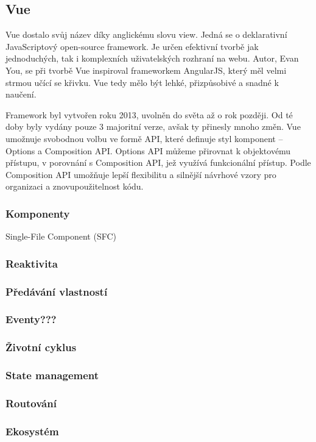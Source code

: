 \subsection{Vue}



Vue dostalo svůj název díky anglickému slovu view. Jedná se o deklarativní JavaScriptový open-source framework. 
Je určen efektivní tvorbě jak jednoduchých, tak i komplexních uživatelských rozhraní na webu. 
Autor, Evan You, se při tvorbě Vue inspiroval frameworkem AngularJS, který měl velmi strmou učící se křivku. Vue tedy mělo být lehké, přizpůsobivé a snadné k naučení.

Framework byl vytvořen roku 2013, uvolněn do světa až o rok později. Od té doby byly vydány pouze 3 majoritní verze, avšak ty přinesly mnoho změn. 
Vue umožnuje svobodnou volbu ve formě API, které definuje styl komponent -- Options a Composition API. 
Options API můžeme přirovnat k objektovému přístupu, v porovnání s Composition API, jež využívá funkcionální přístup. 
Podle \cite{vue} Composition API umožňuje lepší flexibilitu a silnější návrhové vzory pro organizaci a znovupoužitelnost kódu. 

\subsubsection{Komponenty}

Single-File Component (SFC)

\subsubsection{Reaktivita}
\subsubsection{Předávání vlastností}
\subsubsection{Eventy???}
\subsubsection{Životní cyklus}
\subsubsection{State management}
\subsubsection{Routování}
\subsubsection{Ekosystém}
